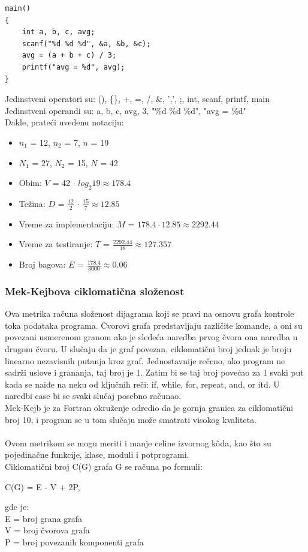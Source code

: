 \documentclass[a4paper]{article}
\begin{document}
\begin{lstlisting}
main()
{
    int a, b, c, avg;
    scanf("%d %d %d", &a, &b, &c);
    avg = (a + b + c) / 3;
    printf("avg = %d", avg);
} 
\end{lstlisting}
Jedinstveni operatori su: (), \{\}, +, =, /, \&, ',', ;, int, scanf, printf, main \\
Jedinstveni operandi su: a, b, c, avg, 3, "\%d \%d \%d", "avg = \%d" \\
Dakle, prateći uvedenu notaciju:
\begin{itemize}
\item $n_1$ = 12, $n_2$ = 7, $n$ = 19
\item $N_1$ = 27, $N_2$ = 15, $N$ = 42
\item Obim: $V$ = 42 $\cdot$ $log_2 19 \approx 178.4 $
\item Težina: $D$ = $\frac{12}{2}$ $\cdot$ $\frac{15}{7} \approx 12.85 $
\item Vreme za implementaciju: $M$ = $ 178.4 \cdot 12.85 \approx 2292.44 $
\item Vreme za testiranje: $T$ = $ \frac{2292.44}{18} \approx 127.357 $
\item Broj bagova: $E$ = $ \frac{178.4}{3000} \approx 0.06 $
\end{itemize}


\subsubsection{Mek-Kejbova ciklomatična složenost}
\label{subsec:mekkejb}

Ova metrika računa složenost dijagrama koji se pravi na osnovu grafa kontrole toka podataka programa. Čvorovi grafa predstavljaju različite komande, a oni su povezani usmerenom granom ako je sledeća naredba prvog čvora ona naredba u drugom čvoru. U slučaju da je graf povezan, ciklomatični broj jednak je broju linearno nezavisnih putanja kroz graf. Jednostavnije rečeno, ako program ne sadrži uslove i grananja, taj broj je 1. Zatim bi se taj broj povećao za 1 svaki put kada se naiđe na neku od ključnih reči: if, while, for, repeat, and, or itd. U naredbi case bi se svaki slučaj posebno računao.\\
Mek-Kejb je za Fortran okruženje odredio da je gornja granica za ciklomatični broj 10, i program se u tom slučaju može smatrati visokog kvaliteta.\cite{mccabe_fortran}\\\\
Ovom metrikom se mogu meriti i manje celine izvornog k\^{o}da, kao što su pojedinačne funkcije, klase, moduli i potprogrami.\\
Ciklomatični broj C(G) grafa G se računa po formuli:
\begin{center}
C(G) = E - V + 2P,
\end{center}
gde je:\\
E = broj grana grafa\\
V = broj čvorova grafa\\
P = broj povezanih komponenti grafa\\
\end{document}
